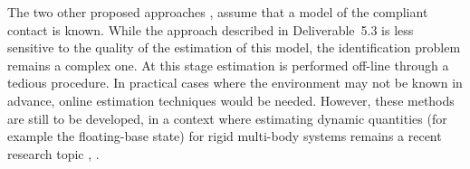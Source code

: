 \documentclass[12pt,a4paper,twoside]{article}
\begin{document}
The two other proposed approaches \cite{AzadIROS2015}, \cite{deliverable53} assume that a model of the compliant contact is known. While the approach described in Deliverable~5.3 \cite{deliverable53} is less sensitive to the quality of the estimation of this model, the identification problem remains a complex one. At this stage estimation is performed off-line through a tedious procedure. In practical cases where the environment may not be known in advance, online estimation techniques would be needed. However, these methods are still to be developed, in a context  where estimating dynamic quantities (for example the floating-base state) for rigid multi-body systems remains a recent research topic \cite{nori2015simultaneous}, \cite{rotella2015humanoid}.


\newpage{}




\newpage{}
\begin{appendices}
\appendices



\end{appendices}
\end{document}
